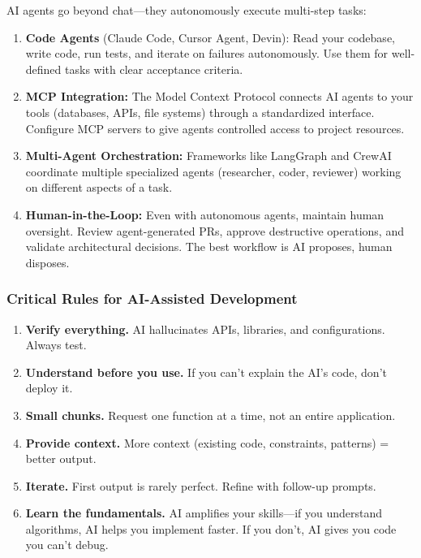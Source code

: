 \documentclass[11pt, a4paper, oneside]{report}
\begin{document}
AI agents go beyond chat---they autonomously execute multi-step tasks:

\begin{enumerate}[leftmargin=*]
\item \textbf{Code Agents} (Claude Code, Cursor Agent, Devin): Read your codebase, write code, run tests, and iterate on failures autonomously. Use them for well-defined tasks with clear acceptance criteria.
\item \textbf{MCP Integration:} The Model Context Protocol connects AI agents to your tools (databases, APIs, file systems) through a standardized interface. Configure MCP servers to give agents controlled access to project resources.
\item \textbf{Multi-Agent Orchestration:} Frameworks like LangGraph and CrewAI coordinate multiple specialized agents (researcher, coder, reviewer) working on different aspects of a task.
\item \textbf{Human-in-the-Loop:} Even with autonomous agents, maintain human oversight. Review agent-generated PRs, approve destructive operations, and validate architectural decisions. The best workflow is AI proposes, human disposes.
\end{enumerate}

\subsubsection{Critical Rules for AI-Assisted Development}

\begin{enumerate}[leftmargin=*]
\item \textbf{Verify everything.} AI hallucinates APIs, libraries, and configurations. Always test.
\item \textbf{Understand before you use.} If you can't explain the AI's code, don't deploy it.
\item \textbf{Small chunks.} Request one function at a time, not an entire application.
\item \textbf{Provide context.} More context (existing code, constraints, patterns) = better output.
\item \textbf{Iterate.} First output is rarely perfect. Refine with follow-up prompts.
\item \textbf{Learn the fundamentals.} AI amplifies your skills---if you understand algorithms, AI helps you implement faster. If you don't, AI gives you code you can't debug.
\end{enumerate}
\end{document}
